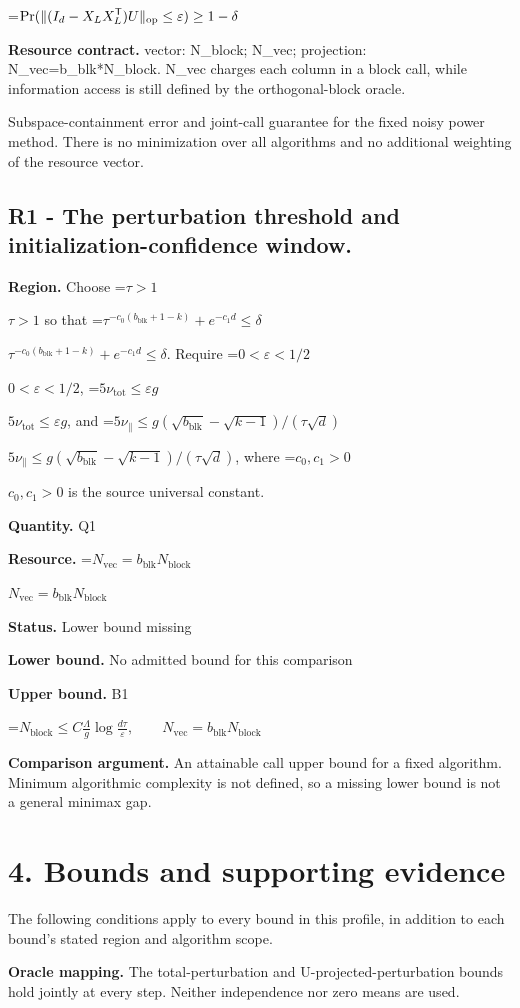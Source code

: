 \documentclass[10pt,a4paper]{article}
\newcommand{\AtlasMath}[1]{\par\begingroup\centering\setbox0=\hbox{$\displaystyle #1$}\ifdim\wd0>1.4\linewidth\typeout{ATLAS WIDE FORMULA: \the\wd0}\fi\ifdim\wd0>\linewidth\resizebox{\linewidth}{!}{\box0}\else\box0\fi\par\endgroup}
\newcommand{\AtlasInlineMath}[1]{\begingroup\setbox0=\hbox{$#1$}\ifdim\wd0>.4\linewidth\endgroup\AtlasMath{#1}\else\endgroup$#1$\fi}
\begin{document}
\AtlasMath{\Pr(\|(I_d-X_LX_L^{\mathsf T})U\|_{\rm op}\le\varepsilon)\ge1-\delta}
\textbf{Resource contract.} vector: N\_block; N\_vec; projection: N\_vec=b\_blk*N\_block. N\_vec charges each column in a block call, while information access is still defined by the orthogonal-block oracle.

Subspace-containment error and joint-call guarantee for the fixed noisy power method. There is no minimization over all algorithms and no additional weighting of the resource vector.

\subsection{R1 - The perturbation threshold and initialization-confidence window.}
\textbf{Region.} Choose \AtlasInlineMath{\tau>1} so that \AtlasInlineMath{\tau^{-c_0(b_{\mathrm{blk}}+1-k)}+e^{-c_1d}\le\delta}. Require \AtlasInlineMath{0<\varepsilon<1/2}, \AtlasInlineMath{5\nu_{\mathrm{tot}}\le\varepsilon g}, and \AtlasInlineMath{5\nu_{\parallel}\le g(\sqrt{b_{\mathrm{blk}}}-\sqrt{k-1})/(\tau\sqrt d)}, where \AtlasInlineMath{c_0,c_1>0} is the source universal constant.

\textbf{Quantity.} Q1

\textbf{Resource.} \AtlasInlineMath{N_{\mathrm{vec}}=b_{\mathrm{blk}}N_{\mathrm{block}}}

\textbf{Status.} Lower bound missing

\textbf{Lower bound.} No admitted bound for this comparison

\textbf{Upper bound.} B1

\AtlasMath{N_{\mathrm{block}}\le C\frac{\Lambda}{g}\log\frac{d\tau}{\varepsilon},\qquad N_{\mathrm{vec}}=b_{\mathrm{blk}}N_{\mathrm{block}}}
\textbf{Comparison argument.} An attainable call upper bound for a fixed algorithm. Minimum algorithmic complexity is not defined, so a missing lower bound is not a general minimax gap.

\section{4. Bounds and supporting evidence}
The following conditions apply to every bound in this profile, in addition to each bound's stated region and algorithm scope.

\textbf{Oracle mapping.} The total-perturbation and U-projected-perturbation bounds hold jointly at every step. Neither independence nor zero means are used.
\end{document}

